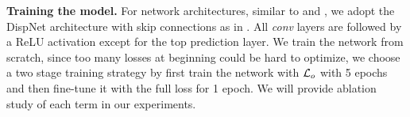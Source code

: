 
\textbf{Training the model.} For network architectures, similar to \cite{zhou2017unsupervised} and \cite{godard2016unsupervised}, we adopt the DispNet \cite{mayer2016large} architecture with skip connections as in \cite{zhou2017unsupervised}. All \textit{conv} layers are followed by a ReLU activation except for the top prediction layer. We train the network from scratch, since too many losses at beginning could be hard to optimize, we choose a two stage training strategy by first train the network with ${\mathcal L}_{o}$ with 5 epochs and then fine-tune it with the full loss for 1 epoch. We will provide ablation study of each term in our experiments.




 



